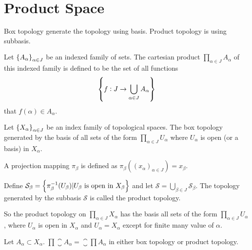 \section{Product Space}

Box topology generate the topology using basis. Product topology is using subbasis.
    
\begin{definition}
    Let $\set{A_{\alpha}}_{\alpha \in J}$ be an indexed family of sets. The cartesian product $\displaystyle \prod_{\alpha \in J} A_{\alpha}$ of this indexed family is defined to be the set of all functions 
    \begin{equation}
        \set{f : J \rightarrow \bigcup_{\alpha \in J} A_{\alpha}}
    \end{equation}
    that $f(\alpha) \in A_{\alpha}$.
\end{definition}

\begin{definition}
    Let $\set{X_{\alpha}}_{\alpha \in J}$ be an index family of topological spaces. The box topology generated by the basis of all sets of the form $\displaystyle \prod_{\alpha \in J} U_{\alpha}$ where $U_{\alpha}$ is open (or a basis) in $X_{\alpha}$. 
\end{definition}

\begin{definition}
    A projection mapping $\pi_\beta$ is defined as $\pi_\beta \left( (x_{\alpha})_{\alpha \in J} \right) = x_\beta$.
\end{definition}

\begin{definition}
    Define $\mathcal{S}_{\beta} = \set{\pi_{\beta}^{-1}(U_{\beta}) | U_{\beta}\text{ is open in }X_{\beta}}$ and let $\mathcal{S} = \displaystyle \bigcup_{\beta \in J} \mathcal{S}_{\beta}$. The topology generated by the subbasis $\mathcal{S}$ is called the product topology. 
    
    So the product topology on $\displaystyle \prod_{\alpha \in J} X_{\alpha}$ has the basis all sets of the form $\displaystyle \prod_{\alpha \in J} U_{\alpha}$, where $U_{\alpha}$ is open in $X_{\alpha}$ and $U_{\alpha} = X_{\alpha}$ except for finite many value of $\alpha$.
\end{definition}

\begin{theorem}
Let $A_{\alpha} \subset X_{\alpha}$. $\displaystyle \prod \closure{A_{\alpha}} = \closure{\prod A_{\alpha}}$ in either box topology or product topology.
\end{theorem}


